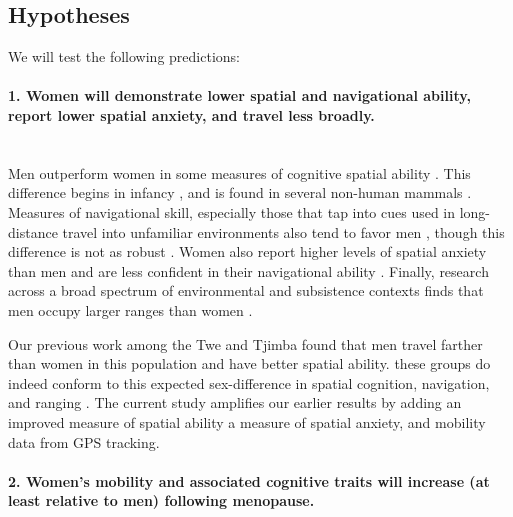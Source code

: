 	\subsection{Hypotheses}
	\label{sec:1.2}
	
We will test the following predictions:	
	
\paragraph{1. Women will demonstrate lower spatial and navigational ability, report lower spatial anxiety, and travel less broadly.}\mbox{}\\

Men outperform women in some measures of cognitive spatial ability \citep{sanders1982sex, shepard1971mental, eals1994hunter, lawton2010gender}.  This difference begins in infancy \citep{quinn2008sex, moore2008mental, levine1999early}, and is found in several non-human mammals \citep{javsarevic2012spatial, perdue2011sex, gaulin1986sex}.  Measures of navigational skill, especially those that tap into cues used in long-distance travel into unfamiliar environments also tend to favor men \citep{moffat1998navigation, bryant1982personality, galea1993sex, henrie1997gender}, though this difference is not as robust \citep{burke2012women, gilmartin1984comparing, montello1999comparison}.  Women also report higher levels of spatial anxiety than men and are less confident in their navigational ability \citep{devlin1995interactive, lawton1994gender, picucci2011besides}.  Finally, research across a broad spectrum of environmental and subsistence contexts finds that men occupy larger ranges than women \citep{ecuyer2004have, gaulin1988evolution, macdonald1999reproductive}.

Our previous work among the Twe and Tjimba found that men travel farther than women in this population and have better spatial ability.  these groups do indeed conform to this expected sex-difference in spatial cognition, navigation, and ranging \citep{vashro2014spatial}. The current study amplifies our earlier results by adding an improved measure of spatial ability a measure of spatial anxiety, and mobility data from GPS tracking.

\paragraph{2.  Women's mobility and associated cognitive traits will increase (at least relative to men) following menopause.}\mbox{}\\

